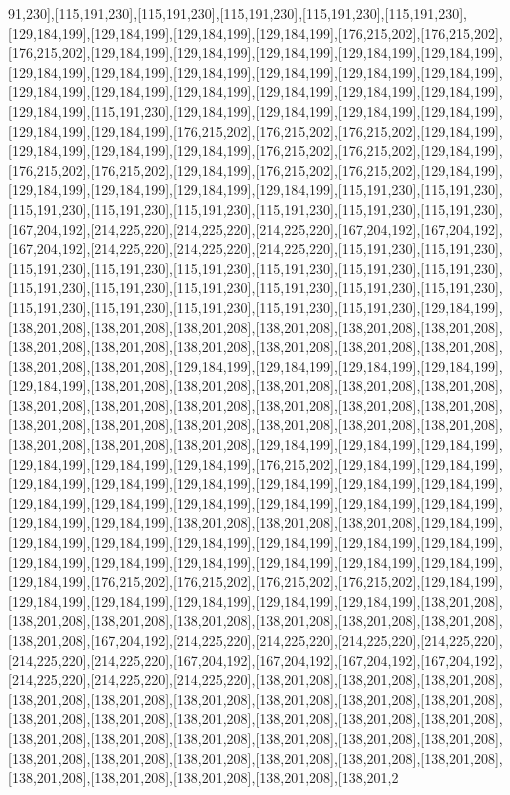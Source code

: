 91,230],[115,191,230],[115,191,230],[115,191,230],[115,191,230],[115,191,230],[129,184,199],[129,184,199],[129,184,199],[129,184,199],[176,215,202],[176,215,202],[176,215,202],[129,184,199],[129,184,199],[129,184,199],[129,184,199],[129,184,199],[129,184,199],[129,184,199],[129,184,199],[129,184,199],[129,184,199],[129,184,199],[129,184,199],[129,184,199],[129,184,199],[129,184,199],[129,184,199],[129,184,199],[129,184,199],[115,191,230],[129,184,199],[129,184,199],[129,184,199],[129,184,199],[129,184,199],[129,184,199],[176,215,202],[176,215,202],[176,215,202],[129,184,199],[129,184,199],[129,184,199],[129,184,199],[176,215,202],[176,215,202],[129,184,199],[176,215,202],[176,215,202],[129,184,199],[176,215,202],[176,215,202],[129,184,199],[129,184,199],[129,184,199],[129,184,199],[129,184,199],[115,191,230],[115,191,230],[115,191,230],[115,191,230],[115,191,230],[115,191,230],[115,191,230],[115,191,230],[167,204,192],[214,225,220],[214,225,220],[214,225,220],[167,204,192],[167,204,192],[167,204,192],[214,225,220],[214,225,220],[214,225,220],[115,191,230],[115,191,230],[115,191,230],[115,191,230],[115,191,230],[115,191,230],[115,191,230],[115,191,230],[115,191,230],[115,191,230],[115,191,230],[115,191,230],[115,191,230],[115,191,230],[115,191,230],[115,191,230],[115,191,230],[115,191,230],[115,191,230],[129,184,199],[138,201,208],[138,201,208],[138,201,208],[138,201,208],[138,201,208],[138,201,208],[138,201,208],[138,201,208],[138,201,208],[138,201,208],[138,201,208],[138,201,208],[138,201,208],[138,201,208],[129,184,199],[129,184,199],[129,184,199],[129,184,199],[129,184,199],[138,201,208],[138,201,208],[138,201,208],[138,201,208],[138,201,208],[138,201,208],[138,201,208],[138,201,208],[138,201,208],[138,201,208],[138,201,208],[138,201,208],[138,201,208],[138,201,208],[138,201,208],[138,201,208],[138,201,208],[138,201,208],[138,201,208],[138,201,208],[129,184,199],[129,184,199],[129,184,199],[129,184,199],[129,184,199],[129,184,199],[176,215,202],[129,184,199],[129,184,199],[129,184,199],[129,184,199],[129,184,199],[129,184,199],[129,184,199],[129,184,199],[129,184,199],[129,184,199],[129,184,199],[129,184,199],[129,184,199],[129,184,199],[129,184,199],[129,184,199],[138,201,208],[138,201,208],[138,201,208],[129,184,199],[129,184,199],[129,184,199],[129,184,199],[129,184,199],[129,184,199],[129,184,199],[129,184,199],[129,184,199],[129,184,199],[129,184,199],[129,184,199],[129,184,199],[129,184,199],[176,215,202],[176,215,202],[176,215,202],[176,215,202],[129,184,199],[129,184,199],[129,184,199],[129,184,199],[129,184,199],[129,184,199],[138,201,208],[138,201,208],[138,201,208],[138,201,208],[138,201,208],[138,201,208],[138,201,208],[138,201,208],[167,204,192],[214,225,220],[214,225,220],[214,225,220],[214,225,220],[214,225,220],[214,225,220],[167,204,192],[167,204,192],[167,204,192],[167,204,192],[214,225,220],[214,225,220],[214,225,220],[138,201,208],[138,201,208],[138,201,208],[138,201,208],[138,201,208],[138,201,208],[138,201,208],[138,201,208],[138,201,208],[138,201,208],[138,201,208],[138,201,208],[138,201,208],[138,201,208],[138,201,208],[138,201,208],[138,201,208],[138,201,208],[138,201,208],[138,201,208],[138,201,208],[138,201,208],[138,201,208],[138,201,208],[138,201,208],[138,201,208],[138,201,208],[138,201,208],[138,201,208],[138,201,208],[138,201,208],[138,201,2